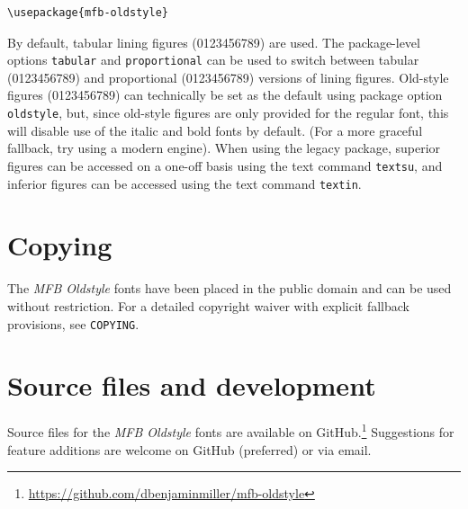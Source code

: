 \documentclass[12pt]{article}
\begin{document}
\begin{verbatim}
\usepackage{mfb-oldstyle}
\end{verbatim}

By default, tabular lining figures (0123456789) are used. The package-level options \texttt{tabular} and \texttt{proportional} can be used to switch between tabular ({0123456789}) and proportional ({0123456789}) versions of lining figures. Old-style figures ({0123456789}) can technically be set as the default using package option \texttt{oldstyle}, but, since old-style figures are only provided for the regular font, this will disable use of the italic and bold fonts by default. (For a more graceful fallback, try using a modern  engine). When using the legacy  package, superior figures can be accessed on a one-off basis using the text command \texttt{textsu}, and inferior figures can be accessed using the text command \texttt{textin}.

\section{Copying}

The \textit{MFB Oldstyle} fonts have been placed in the public domain and can be used without restriction. For a detailed copyright waiver with explicit fallback provisions, see \texttt{COPYING}.

\section{Source files and development}

Source files for the \textit{MFB Oldstyle} fonts are available on GitHub.\footnote{\url{https://github.com/dbenjaminmiller/mfb-oldstyle}} Suggestions for feature additions are welcome on GitHub (preferred) or via email.
\end{document}
